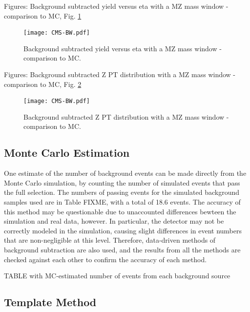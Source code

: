 Figures: Background subtracted yield versus eta with a MZ mass window - comparison to MC, Fig. \ref{fig:YieldVsZEtaComparedToMC}

 \begin{figure}[htb]
  \begin{center}
    \texttt{[image: CMS-BW.pdf]}
  \end{center}
  \caption[Background subtracted yield versus eta with a MZ mass window - comparison to MC]{Background subtracted yield versus eta with a MZ mass window - comparison to MC.}
  \label{fig:YieldVsZEtaComparedToMC}
 \end{figure}

Figures: Background subtracted Z PT distribution with a MZ mass window - comparison to MC, Fig. \ref{fig:YieldVsZPtComparedToMC}

 \begin{figure}[htb]
  \begin{center}
    \texttt{[image: CMS-BW.pdf]}
  \end{center}
  \caption[Background subtracted Z PT distribution with a MZ mass window - comparison to MC]{Background subtracted Z PT distribution with a MZ mass window - comparison to MC.}
  \label{fig:YieldVsZPtComparedToMC}
 \end{figure}

\subsection{Monte Carlo Estimation}
One estimate of the number of background events can be made 
directly from the Monte Carlo simulation, 
by counting the number of simulated events that pass 
the full selection.  
The numbers of passing events for the simulated background 
samples used are in Table FIXME, 
with a total of 18.6 events.  
The accuracy of this method may be questionable due to 
unaccounted differences bewteen the simulation and real data, however.  
In particular, 
the detector may not be correctly modeled in the simulation, 
causing slight differences in event numbers 
that are non-negligible at this level.  
Therefore, data-driven methods of background subtraction 
are also used, 
and the results from all the methods are checked against each other 
to confirm the accuracy of each method.  

TABLE with MC-estimated number of events from each background source

\subsection{Template Method}


